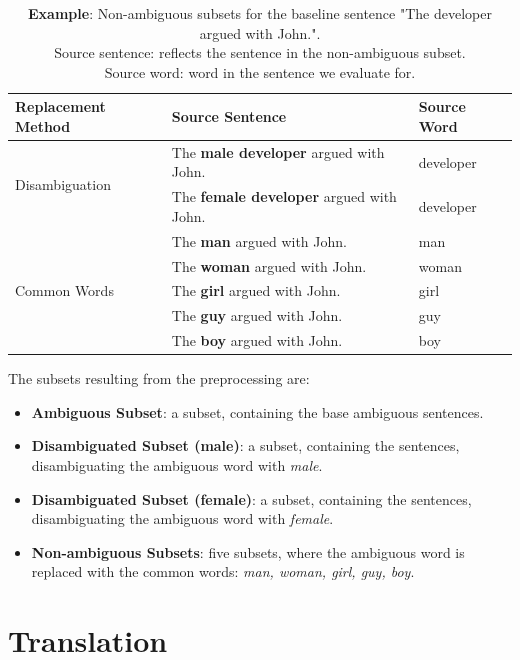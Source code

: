 \begin{table}[!htb]
    \begin{tabularx}{\linewidth}{|l|X|l|}
        \hline
        \textbf{Replacement Method} & \textbf{Source Sentence} & \textbf{Source Word} \\ \hline
        \multirow{2}{*}{Disambiguation} & The \textbf{male developer} argued with John. & developer \\
        & The \textbf{female developer} argued with John. & developer \\ \hline
        \multirow{5}{*}{Common Words} & The \textbf{man} argued with John. & man \\
        & The \textbf{woman} argued with John. & woman \\
        & The \textbf{girl} argued with John. & girl \\
        & The \textbf{guy} argued with John. & guy \\
        & The \textbf{boy} argued with John. & boy \\ \hline
    \end{tabularx}
    \caption{\textbf{Example}: Non-ambiguous subsets for the baseline sentence "The developer argued with John.". \\ Source sentence: reflects the sentence in the non-ambiguous subset. \\ Source word: word in the sentence we evaluate for.}
    \label{tab:preprocessing}
\end{table}

The subsets resulting from the preprocessing are: 
\begin{itemize}
    \item \textbf{Ambiguous Subset}: a subset, containing the base ambiguous sentences.
    \item \textbf{Disambiguated Subset (male)}: a subset, containing the sentences, disambiguating the ambiguous word with \textit{male}.
    \item \textbf{Disambiguated Subset (female)}: a subset, containing the sentences, disambiguating the ambiguous word with \textit{female}.
    \item \textbf{Non-ambiguous Subsets}: five subsets, where the ambiguous word is replaced with the common words: \textit{man, woman, girl, guy, boy}.
\end{itemize}



\section{Translation}
\label{sec:Base_Experiment:Translation}

